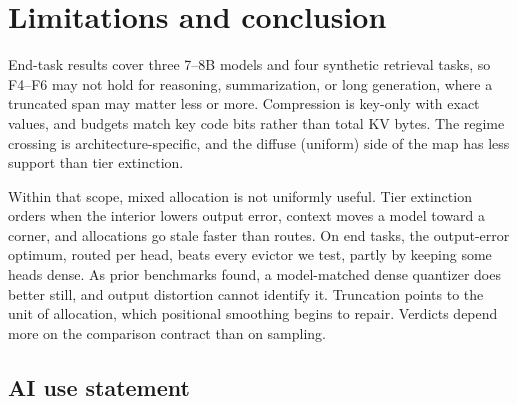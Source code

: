 \documentclass{article}
\newif\ifshowest \showesttrue
\DeclareRobustCommand{\estonly}[1]{\ifshowest#1\else\ifhmode\unskip\fi\fi}
\theoremstyle{definition}
\begin{document}
\section{Limitations and conclusion}
\label{sec:conclusion}

End-task results cover three 7--8B models and four synthetic retrieval tasks, 
so F4--F6 may not hold for reasoning, summarization, or long generation, where a truncated span may matter less or more.  
Compression is key-only with exact values, and budgets match key code bits rather than total KV bytes. %
The regime crossing is architecture-specific, and the diffuse (uniform) side of the map has less support than tier extinction.

Within that scope, mixed allocation is not uniformly useful.  Tier extinction orders when the interior lowers output error, context moves a model toward a corner, and allocations go stale faster than routes.
On end tasks, the output-error optimum, routed per head, beats every evictor we test, partly by keeping some heads dense.  As prior benchmarks found, a model-matched dense quantizer does better still, and output distortion cannot identify it.
Truncation points to the unit of allocation, which positional smoothing begins to repair.  Verdicts depend more on the comparison contract than on sampling.

\label{main:end}

\subsection*{AI use statement}
\end{document}
